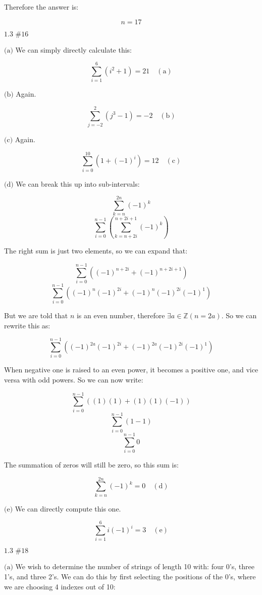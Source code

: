\documentclass{article}
\newcommand{\problem}[2]{$\boxed{\text{#1 \##2}}$}
\newcommand{\subproblem}[1]{$\boxed{\text{(#1)}}$}
\newcommand{\subsolution}[2]{\boxed{#2\quad(\text{#1})}}
\newcommand{\solution}[1]{\boxed{#1}}
\begin{document}
\begin{multicols*}{2}
Therefore the answer is:

\[
\solution{n=17}
\]

%
\problem{1.3}{16}

%
\subproblem{a} We can simply directly calculate this:

\[
\subsolution{a}{\sum\limits_{i=1}^6 (i^2+1)=21}
\]

%
\subproblem{b} Again.

\[
\subsolution{b}{\sum\limits_{j=-2}^2 (j^3-1)=-2}
\]

%
\subproblem{c} Again.

\[
\subsolution{c}{\sum\limits_{i=0}^{10} (1+(-1)^i)=12}
\]

%
\subproblem{d} We can break this up into sub-intervals:

\[
\sum\limits_{k=n}^{2n} (-1)^k
\] \[
\sum\limits_{i=0}^{n-1} \left(\sum\limits_{k=n+2i}^{n+2i+1} (-1)^k\right)
\]

The right sum is just two elements, so we can expand that:

\[
\sum\limits_{i=0}^{n-1} \left((-1)^{n+2i} + (-1)^{n+2i+1}\right)
\] \[
\sum\limits_{i=0}^{n-1} \left((-1)^{n}(-1)^{2i} + (-1)^{n}(-1)^{2i}(-1)^{1}\right)
\]

But we are told that $n$ is an even number, therefore
$\exists{}a\in\mathbb{Z}(n=2a)$. So we can rewrite this as:

\[
\sum\limits_{i=0}^{n-1} \left((-1)^{2a}(-1)^{2i} + (-1)^{2a}(-1)^{2i}(-1)^{1}\right)
\]

When negative one is raised to an even power, it becomes a positive
one, and vice versa with odd powers. So we can now write:

\[
\sum\limits_{i=0}^{n-1} \left((1)(1) + (1)(1)(-1)\right)
\] \[
\sum\limits_{i=0}^{n-1} \left(1-1\right)
\] \[
\sum\limits_{i=0}^{n-1} 0
\]

The summation of zeros will still be zero, so this sum is:

\[
\subsolution{d}{\sum\limits_{k=n}^{2n} (-1)^k=0}
\]

%
\subproblem{e} We can directly compute this one.

\[
\subsolution{e}{\sum\limits_{i=1}^{6} i(-1)^i=3}
\]

%
\problem{1.3}{18}

%
\subproblem{a} We wish to determine the number of strings of length 10
with: four 0's, three 1's, and three 2's. We can do this by first
selecting the positions of the 0's, where we are choosing 4 indexes
out of 10:


\end{multicols*}
\end{document}
